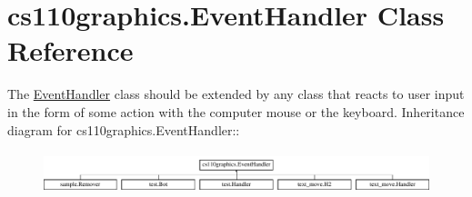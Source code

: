 \hypertarget{classcs110graphics_1_1EventHandler}{
\section{cs110graphics.EventHandler Class Reference}
\label{classcs110graphics_1_1EventHandler}
}


The \hyperlink{classcs110graphics_1_1EventHandler}{EventHandler} class should be extended by any class that reacts to user input in the form of some action with the computer mouse or the keyboard.  
Inheritance diagram for cs110graphics.EventHandler::\begin{figure}[H]
\begin{center}
\leavevmode
\includegraphics[height=1.21739cm]{classcs110graphics_1_1EventHandler}
\end{center}
\end{figure}
